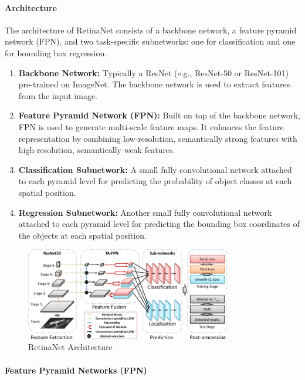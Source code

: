 \documentclass[12pt]{article}
\begin{document}
\paragraph{Architecture}

The architecture of RetinaNet consists of a backbone network, a feature pyramid network (FPN), and two task-specific subnetworks: one for classification and one for bounding box regression.

\begin{enumerate}
    \item \textbf{Backbone Network:} Typically a ResNet (e.g., ResNet-50 or ResNet-101) pre-trained on ImageNet. The backbone network is used to extract features from the input image.
    
    \item \textbf{Feature Pyramid Network (FPN):} Built on top of the backbone network, FPN is used to generate multi-scale feature maps. It enhances the feature representation by combining low-resolution, semantically strong features with high-resolution, semantically weak features.
    
    \item \textbf{Classification Subnetwork:} A small fully convolutional network attached to each pyramid level for predicting the probability of object classes at each spatial position.
    
    \item \textbf{Regression Subnetwork:} Another small fully convolutional network attached to each pyramid level for predicting the bounding box coordinates of the objects at each spatial position.
\end{enumerate}

\begin{figure}[h]
    \centering
    \includegraphics[width=0.8\textwidth]{./media/retinaNet.png}
    \caption{RetinaNet Architecture}
    \label{fig:retinanet_architecture}
\end{figure}

\paragraph{Feature Pyramid Networks (FPN)}
\end{document}
